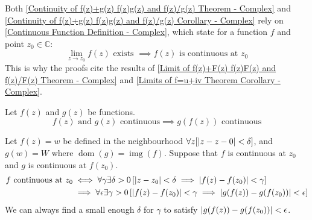 \documentclass[12pt, english]{book}
\makeatletter
\renewenvironment{proof}[1][\proofname]{\par
	\pushQED{\qed}%
	\normalfont \topsep6\p@\@plus6\p@\relax
	\list{}{%
		\settowidth{\leftmargin}{\itshape\proofname:\hskip\labelsep}%
		\setlength{\labelwidth}{0pt}%
		\setlength{\itemindent}{-\leftmargin}%
		}%
	\item[\hskip\labelsep\itshape#1\@addpunct{:}]\ignorespaces
	}{\popQED\endlist\@endpefalse}
\makeatother
\begin{document}
	\begin{observation}
		Both \cref{Continuity of f(z)+g(z) f(z)g(z) and f(z)/g(z) Theorem - Complex} and \cref{Continuity of f(z)+g(z) f(z)g(z) and f(z)/g(z) Corollary - Complex} rely on \cref{Continuous Function Definition - Complex}, which state for a function $f$ and point $z_0 \in \mathbb{C}$:
		$$\lim_{z \rightarrow z_0} f(z) \text{ exists } \implies f(z) \text{ is continuous at } z_0$$
		This is why the proofs cite the results of \cref{Limit of f(z)+F(z) f(z)F(z) and f(z)/F(z) Theorem - Complex} and \cref{Limits of f=u+iv Theorem Corollary - Complex}.
	\end{observation}

	\begin{theorem}
		Let $f(z)$ and $g(z)$ be functions.
		$$f(z) \text{ and } g(z) \text{ continuous} \implies g(f(z)) \text{ continuous}$$
		\label{Continuity of Composition of Functions Theorem - Complex}
	\end{theorem}
	\begin{proof}
		Let $f(z) = w$ be defined in the neighbourhood $\forall z[\abs{z-z-0}<\delta]$, and $g(w) = W$ where $\operatorname{dom} (g) = \operatorname{img}(f)$. Suppose that $f$ is continuous at $z_0$ and $g$ is continuous at $f(z_0)$.
		\begin{align*}
			f \text{ continuous at } z_0 
			&\iff \forall \gamma \exists \delta>0 \left[ \abs{z-z_0} < \delta \implies \abs{f(z) - f(z_0)}<\gamma \right] \\
			&\implies \forall \epsilon \exists \gamma>0 \left[ \abs{f(z) - f(z_0)} < \gamma \implies \abs{g(f(z)) - g(f(z_0))} < \epsilon \right]
		\end{align*} 
		We can always find a small enough $\delta$ for $\gamma$ to satisfy $\abs{g(f(z)) - g(f(z_0))} < \epsilon$.
	\end{proof}
\end{document}
